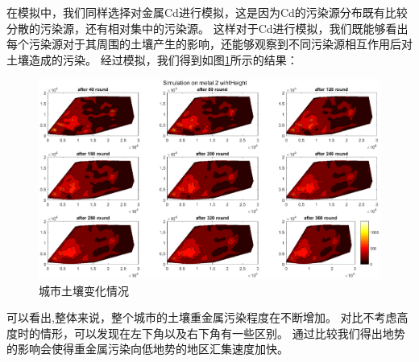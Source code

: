 \documentclass[a4paper]{article}
\begin{document}
在模拟中，我们同样选择对金属Cd进行模拟，这是因为Cd的污染源分布既有比较分散的污染源，还有相对集中的污染源。
这样对于Cd进行模拟，我们既能够看出每个污染源对于其周围的土壤产生的影响，还能够观察到不同污染源相互作用后对土壤造成的污染。
经过模拟，我们得到如图\ref{fig:pollution-with-hight}所示的结果：
\begin{figure}[H]
    \centerline{
    \includegraphics[scale=0.5]{pictures/pollution-with-height-Cd.eps}}
    \caption{城市土壤变化情况}
    \label{fig:pollution-with-hight}
\end{figure}
可以看出,整体来说，整个城市的土壤重金属污染程度在不断增加。
对比不考虑高度时的情形，可以发现在左下角以及右下角有一些区别。
通过比较我们得出地势的影响会使得重金属污染向低地势的地区汇集速度加快。
\end{document}
